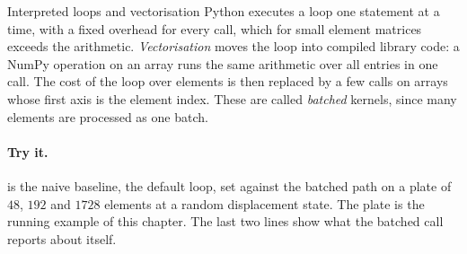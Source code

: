 \begin{sidenote}{Interpreted loops and vectorisation}
Python executes a loop one statement at a time, with a fixed overhead for every call, which for small element matrices exceeds the arithmetic. \emph{Vectorisation} moves the loop into compiled library code: a NumPy operation on an array runs the same arithmetic over all entries in one call. The cost of the loop over elements is then replaced by a few calls on arrays whose first axis is the element index. These are called \emph{batched} kernels, since many elements are processed as one batch.
\end{sidenote}

\paragraph{Try it.}  is the naive baseline, the default loop, set against the batched path on a plate of $48$, $192$ and $1728$  elements at a random displacement state. The plate is the running example of this chapter. The last two lines show what the batched call reports about itself.

